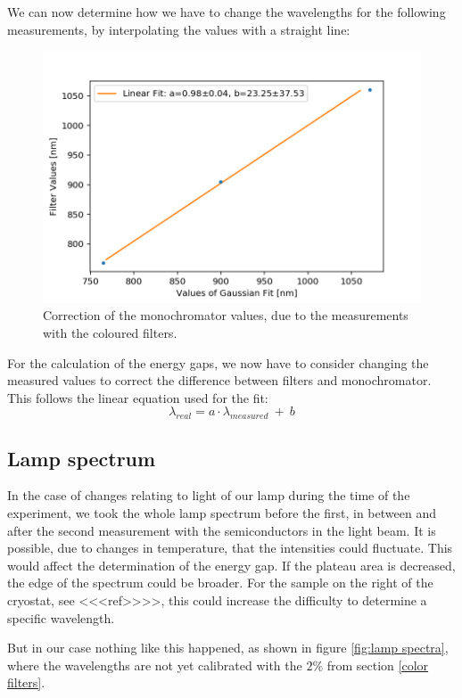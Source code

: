\documentclass[]{article}
\begin{document}
We can now determine how we have to change the wavelengths for the following measurements, by interpolating the values with a straight line:

\begin{figure}[H]
\centering
\includegraphics[width=.9\textwidth]{Plots/LambdaCorrection.png}
\caption{Correction of the monochromator values, due to the measurements with the coloured filters.}
\label{fig:LambdaCorrection}
\end{figure}

For the calculation of the energy gaps, we now have to consider changing the measured values to correct the difference between filters and monochromator. This follows the linear equation used for the fit: 
\begin{equation}
\lambda_{real} = a\cdot \lambda_{measured} \ + \ b
\end{equation}

\subsection{Lamp spectrum} \label{lamp spectrum}
In the case of changes relating to light of our lamp during the time of the experiment, we took the whole lamp spectrum before the first, in between and after the second measurement with the semiconductors in the light beam. It is possible, due to changes in temperature, that the intensities could fluctuate. This would affect the determination of the energy gap. If the plateau area is decreased, the edge of the spectrum could be broader. For the sample on the right of the cryostat, see <<<ref>>>>, this could increase the difficulty to determine a specific wavelength.

But in our case nothing like this happened, as shown in figure \ref{fig:lamp spectra}, where the wavelengths are not yet calibrated with the $2\%$ from section \ref{color filters}.
\end{document}
